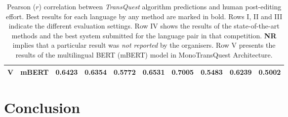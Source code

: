 \begin{table}[t]
\begin{center}
{\begin{tabular}{l l  c c c c c c c c}
			\midrule
			\multirow{1}{*}{\bf V} & mBERT & 0.6423 & 0.6354 & 0.5772 & 0.6531 & 0.7005 & 0.5483 & 0.6239 & 0.5002 \\
			\bottomrule
		\end{tabular}
	}
	\end{center}
	\caption[Pearson correlation between TransQuest algorithm predictions and human post-editing effort]{Pearson ($r$) correlation between \textit{TransQuest} algorithm predictions and human post-editing effort. Best results for each language by any method are marked in bold. Rows I, II and III indicate the different evaluation settings. Row IV shows the results of the state-of-the-art methods and the best system submitted for the language pair in that competition. \textbf{NR} implies that a particular result 
		was \textit{not reported} by the organisers. Row V presents the results of the multilingual BERT (mBERT) model in MonoTransQuest Architecture.} 
	\label{tab:hter_prediction}
\end{table}
\section{Conclusion}